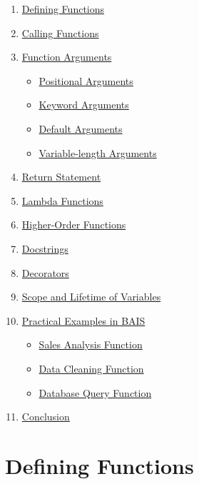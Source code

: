 \documentclass[
  letterpaper,
  DIV=11,
  numbers=noendperiod]{scrreprt}
\providecommand{\tightlist}{%
  \setlength{\itemsep}{0pt}\setlength{\parskip}{0pt}}\usepackage{longtable,booktabs,array}
\begin{document}
\begin{enumerate}
\def\labelenumi{\arabic{enumi}.}
\tightlist
\item
  \hyperref[defining-functions]{Defining Functions}
\item
  \hyperref[calling-functions]{Calling Functions}
\item
  \hyperref[function-arguments]{Function Arguments}

  \begin{itemize}
  \tightlist
  \item
    \hyperref[positional-arguments]{Positional Arguments}
  \item
    \hyperref[keyword-arguments]{Keyword Arguments}
  \item
    \hyperref[default-arguments]{Default Arguments}
  \item
    \hyperref[variable-length-arguments]{Variable-length Arguments}
  \end{itemize}
\item
  \hyperref[return-statement]{Return Statement}
\item
  \hyperref[lambda-functions]{Lambda Functions}
\item
  \hyperref[higher-order-functions]{Higher-Order Functions}
\item
  \hyperref[docstrings]{Docstrings}
\item
  \hyperref[decorators]{Decorators}
\item
  \hyperref[scope-and-lifetime-of-variables]{Scope and Lifetime of
  Variables}
\item
  \hyperref[practical-examples-in-bais]{Practical Examples in BAIS}

  \begin{itemize}
  \tightlist
  \item
    \hyperref[sales-analysis-function]{Sales Analysis Function}
  \item
    \hyperref[data-cleaning-function]{Data Cleaning Function}
  \item
    \hyperref[database-query-function]{Database Query Function}
  \end{itemize}
\item
  \hyperref[conclusion]{Conclusion}
\end{enumerate}

\section{Defining Functions}\label{defining-functions-1}
\end{document}
